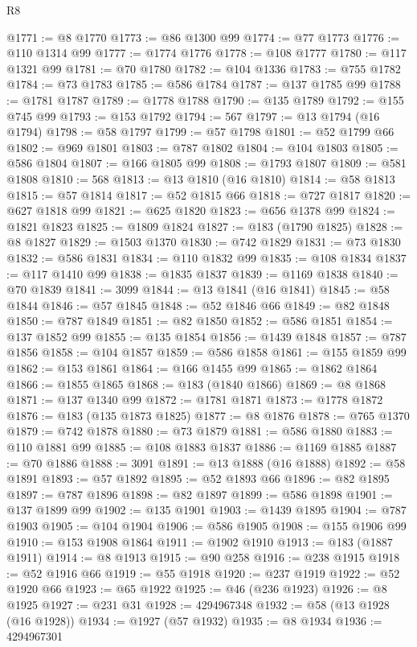 \begin{lexlean}{R8}
\begin{coremodule}
@1771 := @8 @1770
@1773 := @86 @1300 @99
@1774 := @77 @1773
@1776 := @110 @1314 @99
@1777 := @1774 @1776
@1778 := @108 @1777
@1780 := @117 @1321 @99
@1781 := @70 @1780
@1782 := @104 @1336
@1783 := @755 @1782
@1784 := @73 @1783
@1785 := @586 @1784
@1787 := @137 @1785 @99
@1788 := @1781 @1787
@1789 := @1778 @1788
@1790 := @135 @1789
@1792 := @155 @745 @99
@1793 := @153 @1792
@1794 := 567
@1797 := @13 @1794 (@16 @1794)
@1798 := @58 @1797
@1799 := @57 @1798
@1801 := @52 @1799 @66
@1802 := @969 @1801
@1803 := @787 @1802
@1804 := @104 @1803
@1805 := @586 @1804
@1807 := @166 @1805 @99
@1808 := @1793 @1807
@1809 := @581 @1808
@1810 := 568
@1813 := @13 @1810 (@16 @1810)
@1814 := @58 @1813
@1815 := @57 @1814
@1817 := @52 @1815 @66
@1818 := @727 @1817
@1820 := @627 @1818 @99
@1821 := @625 @1820
@1823 := @656 @1378 @99
@1824 := @1821 @1823
@1825 := @1809 @1824
@1827 := @183 (@1790 @1825)
@1828 := @8 @1827
@1829 := @1503 @1370
@1830 := @742 @1829
@1831 := @73 @1830
@1832 := @586 @1831
@1834 := @110 @1832 @99
@1835 := @108 @1834
@1837 := @117 @1410 @99
@1838 := @1835 @1837
@1839 := @1169 @1838
@1840 := @70 @1839
@1841 := 3099
@1844 := @13 @1841 (@16 @1841)
@1845 := @58 @1844
@1846 := @57 @1845
@1848 := @52 @1846 @66
@1849 := @82 @1848
@1850 := @787 @1849
@1851 := @82 @1850
@1852 := @586 @1851
@1854 := @137 @1852 @99
@1855 := @135 @1854
@1856 := @1439 @1848
@1857 := @787 @1856
@1858 := @104 @1857
@1859 := @586 @1858
@1861 := @155 @1859 @99
@1862 := @153 @1861
@1864 := @166 @1455 @99
@1865 := @1862 @1864
@1866 := @1855 @1865
@1868 := @183 (@1840 @1866)
@1869 := @8 @1868
@1871 := @137 @1340 @99
@1872 := @1781 @1871
@1873 := @1778 @1872
@1876 := @183 (@135 @1873 @1825)
@1877 := @8 @1876
@1878 := @765 @1370
@1879 := @742 @1878
@1880 := @73 @1879
@1881 := @586 @1880
@1883 := @110 @1881 @99
@1885 := @108 @1883 @1837
@1886 := @1169 @1885
@1887 := @70 @1886
@1888 := 3091
@1891 := @13 @1888 (@16 @1888)
@1892 := @58 @1891
@1893 := @57 @1892
@1895 := @52 @1893 @66
@1896 := @82 @1895
@1897 := @787 @1896
@1898 := @82 @1897
@1899 := @586 @1898
@1901 := @137 @1899 @99
@1902 := @135 @1901
@1903 := @1439 @1895
@1904 := @787 @1903
@1905 := @104 @1904
@1906 := @586 @1905
@1908 := @155 @1906 @99
@1910 := @153 @1908 @1864
@1911 := @1902 @1910
@1913 := @183 (@1887 @1911)
@1914 := @8 @1913
@1915 := @90 @258
@1916 := @238 @1915
@1918 := @52 @1916 @66
@1919 := @55 @1918
@1920 := @237 @1919
@1922 := @52 @1920 @66
@1923 := @65 @1922
@1925 := @46 (@236 @1923)
@1926 := @8 @1925
@1927 := @231 @31
@1928 := 4294967348
@1932 := @58 (@13 @1928 (@16 @1928))
@1934 := @1927 (@57 @1932)
@1935 := @8 @1934
@1936 := 4294967301

\end{coremodule}
\end{lexlean}
